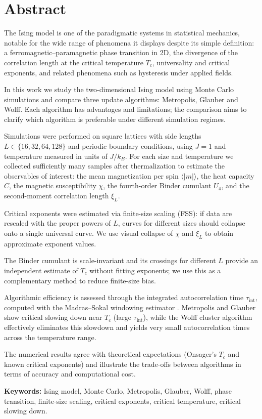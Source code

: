 \section*{Abstract}

The Ising model is one of the paradigmatic systems in statistical mechanics, notable for the wide range of phenomena it displays despite its simple definition: a ferromagnetic–paramagnetic phase transition in 2D, the divergence of the correlation length at the critical temperature $T_c$, universality and critical exponents, and related phenomena such as hysteresis under applied fields.

In this work we study the two-dimensional Ising model using Monte Carlo simulations and compare three update algorithms: Metropolis, Glauber and Wolff. Each algorithm has advantages and limitations; the comparison aims to clarify which algorithm is preferable under different simulation regimes.

Simulations were performed on square lattices with side lengths $L\in\{16,32,64,128\}$ and periodic boundary conditions, using $J=1$ and temperature measured in units of $J/k_B$. For each size and temperature we collected sufficiently many samples after thermalization to estimate the observables of interest: the mean magnetization per spin $\langle|m|\rangle$, the heat capacity $C$, the magnetic susceptibility $\chi$, the fourth-order Binder cumulant $U_4$, and the second-moment correlation length $\xi_L$.

Critical exponents were estimated via finite-size scaling (FSS): if data are rescaled with the proper powers of $L$, curves for different sizes should collapse onto a single universal curve. We use visual collapse of $\chi$ and $\xi_L$ to obtain approximate exponent values.

The Binder cumulant is scale-invariant and its crossings for different $L$ provide an independent estimate of $T_c$ without fitting exponents; we use this as a complementary method to reduce finite-size bias.

Algorithmic efficiency is assessed through the integrated autocorrelation time $\tau_{\mathrm{int}}$, computed with the Madras–Sokal windowing estimator \citep{Madras1988}. Metropolis and Glauber show critical slowing down near $T_c$ (large $\tau_{\mathrm{int}}$), while the Wolff cluster algorithm effectively eliminates this slowdown and yields very small autocorrelation times across the temperature range.

The numerical results agree with theoretical expectations (Onsager's $T_c$ and known critical exponents) and illustrate the trade-offs between algorithms in terms of accuracy and computational cost.

\textbf{Keywords:} Ising model, Monte Carlo, Metropolis, Glauber, Wolff, phase transition, finite-size scaling, critical exponents, critical temperature, critical slowing down.